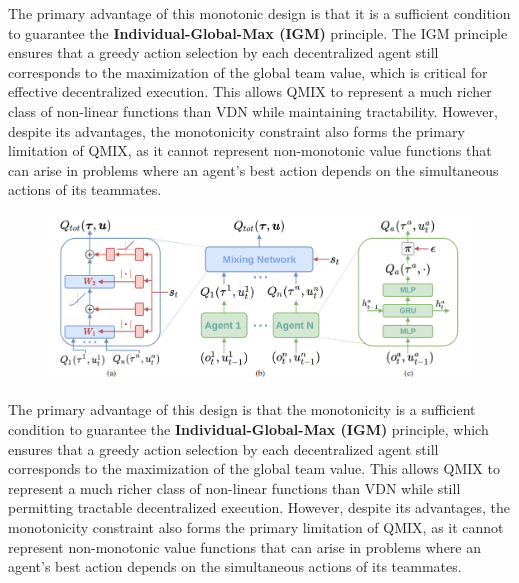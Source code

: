 The primary advantage of this monotonic design is that it is a sufficient condition to guarantee the \textbf{Individual-Global-Max (IGM) } principle. The IGM principle ensures that a greedy action selection by each decentralized agent still corresponds to the maximization of the global team value, which is critical for effective decentralized execution. This allows QMIX to represent a much richer class of non-linear functions than VDN while maintaining tractability. However, despite its advantages, the monotonicity constraint also forms the primary limitation of QMIX, as it cannot represent non-monotonic value functions that can arise in problems where an agent's best action depends on the simultaneous actions of its teammates.
\begin{figure}[H]
    \begin{minipage}{0.6\textwidth}
        
    \includegraphics[width=\linewidth]{img_pfe/QMIX.PNG}
    \end{minipage}
    \hspace{0.05\textwidth} 
    \begin{minipage}{0.3\textwidth}
       
        \label{fig:qmix_architecture}
    \end{minipage}
\end{figure}
The primary advantage of this design is that the monotonicity is a sufficient condition to guarantee the \textbf{Individual-Global-Max (IGM)} principle, which ensures that a greedy action selection by each decentralized agent still corresponds to the maximization of the global team value. This allows QMIX to represent a much richer class of non-linear functions than VDN while still permitting tractable decentralized execution. However, despite its advantages, the monotonicity constraint also forms the primary limitation of QMIX, as it cannot represent non-monotonic value functions that can arise in problems where an agent's best action depends on the simultaneous actions of its teammates.


